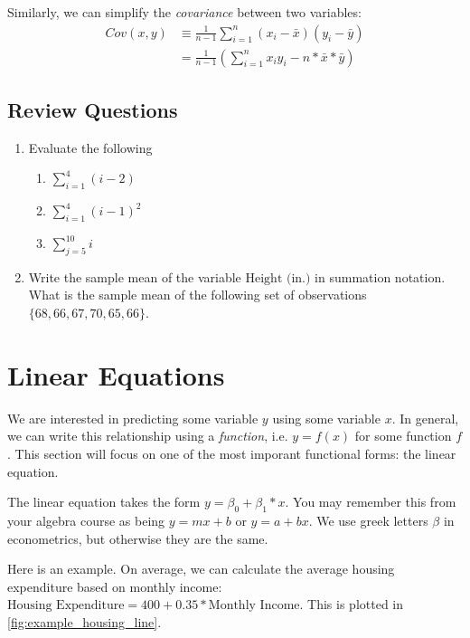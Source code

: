 \documentclass[12pt]{article}
\begin{document}
Similarly, we can simplify the \emph{covariance} between two variables:
\begin{align*}
  Cov(x, y) 
  &\equiv \frac{1}{n-1} \sum_{i=1}^n (x_i - \bar{x}) (y_i - \bar{y}) \\
  &= \frac{1}{n-1} \left( \sum_{i=1}^n x_i y_i - n * \bar{x} * \bar{y} \right)
\end{align*}
 


\subsection{Review Questions}

\begin{enumerate}
  \item Evaluate the following
  \begin{enumerate}
    \item $\sum_{i=1}^4 (i - 2)$
    \item $\sum_{i=1}^4 (i - 1)^2$
    \item $\sum_{j = 5}^{10} i$
  \end{enumerate}

  \item Write the sample mean of the variable $\text{Height (in.)}$ in summation notation. What is the sample mean of the following set of observations $\{ 68, 66, 67, 70, 65, 66 \}$.
\end{enumerate}



\section{Linear Equations}

We are interested in predicting some variable $y$ using some variable $x$. In general, we can write this relationship using a \emph{function}, i.e. $y = f(x)$ for some function $f$. This section will focus on one of the most imporant functional forms: the linear equation. 

The linear equation takes the form $y = \beta_0 + \beta_1 * x$. You may remember this from your algebra course as being $y = mx + b$ or $y = a + bx$. We use greek letters $\beta$ in econometrics, but otherwise they are the same. 

Here is an example. On average, we can calculate the average housing expenditure based on monthly income: $\text{Housing Expenditure} = 400 + 0.35 * \text{Monthly Income}$. This is plotted in \ref{fig:example_housing_line}. 
\end{document}
